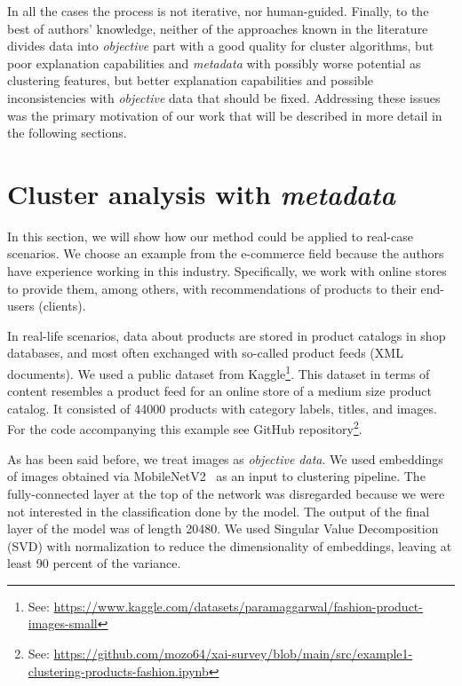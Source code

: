 \documentclass{article}
\begin{document}
In all the cases the process is not iterative, nor human-guided.
Finally, to the best of authors' knowledge, neither of the approaches known in the literature divides data into \textit{objective} part with a good quality for cluster algorithms, but poor explanation capabilities and \textit{metadata} with possibly worse potential as clustering features, but better explanation capabilities and possible inconsistencies with \textit{objective} data that should be fixed.
Addressing these issues was the primary motivation of our work that will be described in more detail in the following sections.

\section{Cluster analysis with \textit{metadata}}
\label{sec:clumeta}
In this section, we will show how our method could be applied to real-case scenarios.
We choose an example from the e-commerce field because the authors have experience working in this industry.
Specifically, we work with online stores to provide them, among others, with recommendations of products to their end-users (clients).

In real-life scenarios, data about products are stored in product catalogs in shop databases, and most often exchanged with so-called product feeds (XML documents).
We used a public dataset from Kaggle\footnote{See: \url{https://www.kaggle.com/datasets/paramaggarwal/fashion-product-images-small}}.
This dataset in terms of content resembles a product feed for an online store of a medium size product catalog.
It consisted of 44000 products with category labels, titles, and images.
For the code accompanying this example see GitHub repository\footnote{See: \url{https://github.com/mozo64/xai-survey/blob/main/src/example1-clustering-products-fashion.ipynb}}.

As has been said before, we treat images as \textit{objective data}.
We used embeddings of images obtained via MobileNetV2~\cite{sandler2019mobilenetv2} as an input to clustering pipeline.
The fully-connected layer at the top of the network was disregarded because we were not interested in the classification done by the model.
The output of the final layer of the model was of length 20480.
We used Singular Value Decomposition (SVD) with normalization to reduce the dimensionality of embeddings, leaving at least 90 percent of the variance.
\end{document}

